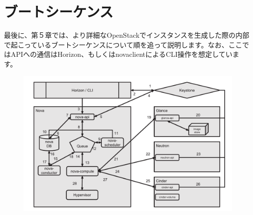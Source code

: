 \documentclass[8pt,b5paper,tombo,openany]{jsbook}
\begin{document}
\chapter{ブートシーケンス}

最後に、第５章では、より詳細なOpenStackでインスタンスを生成した際の内部で起こっているブートシーケンスについて順を追って説明します。なお、ここではAPIへの通信はHorizon、もしくはnovaclientによるCLI操作を想定しています。

\begin{figure}[htbp]
  \begin{center}
    \includegraphics[width=\textwidth]{./img/boot.pdf}
  \end{center}
\end{figure}
\end{document}
